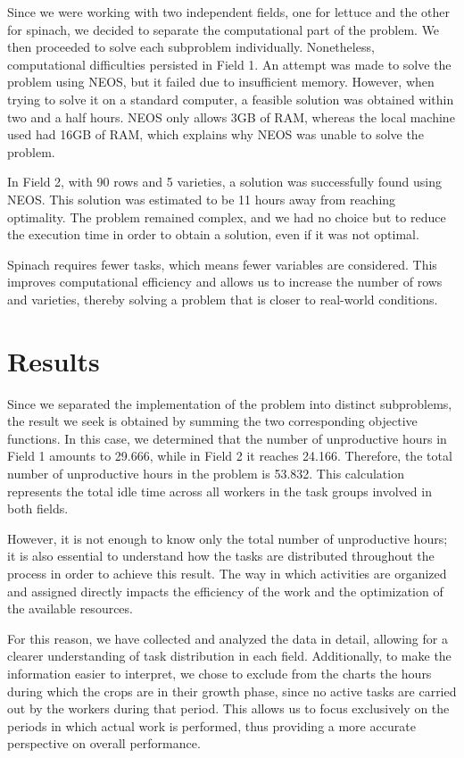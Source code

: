 Since we were working with two independent fields, one for lettuce and the other for spinach, we decided to separate the computational part of the problem.  
We then proceeded to solve each subproblem individually. Nonetheless, computational difficulties persisted in Field 1.  
An attempt was made to solve the problem using NEOS, but it failed due to insufficient memory. However, when trying to solve it on a standard computer,  
a feasible solution was obtained within two and a half hours.  
NEOS only allows 3GB of RAM, whereas the local machine used had 16GB of RAM, which explains why NEOS was unable to solve the problem.


In Field 2, with 90 rows and 5 varieties, a solution was successfully found using NEOS.  
This solution was estimated to be 11 hours away from reaching optimality. The problem remained complex, and we had no choice  
but to reduce the execution time in order to obtain a solution, even if it was not optimal.

Spinach requires fewer tasks, which means fewer variables are considered. This improves computational efficiency and allows us  
to increase the number of rows and varieties, thereby solving a problem that is closer to real-world conditions.

\chapter*{Results}
Since we separated the implementation of the problem into distinct subproblems, the result we seek is obtained by summing the two corresponding objective functions.  
In this case, we determined that the number of unproductive hours in Field 1 amounts to 29.666, while in Field 2 it reaches 24.166.  
Therefore, the total number of unproductive hours in the problem is 53.832. This calculation represents the total idle time across all workers  
in the task groups involved in both fields.

However, it is not enough to know only the total number of unproductive hours; it is also essential to understand how the tasks are distributed throughout the process in order to achieve this result.  
The way in which activities are organized and assigned directly impacts the efficiency of the work and the optimization of the available resources.

For this reason, we have collected and analyzed the data in detail, allowing for a clearer understanding of task distribution in each field.  
Additionally, to make the information easier to interpret, we chose to exclude from the charts the hours during which the crops are in their growth phase,  
since no active tasks are carried out by the workers during that period. This allows us to focus exclusively on the periods in which actual work is performed,  
thus providing a more accurate perspective on overall performance.


